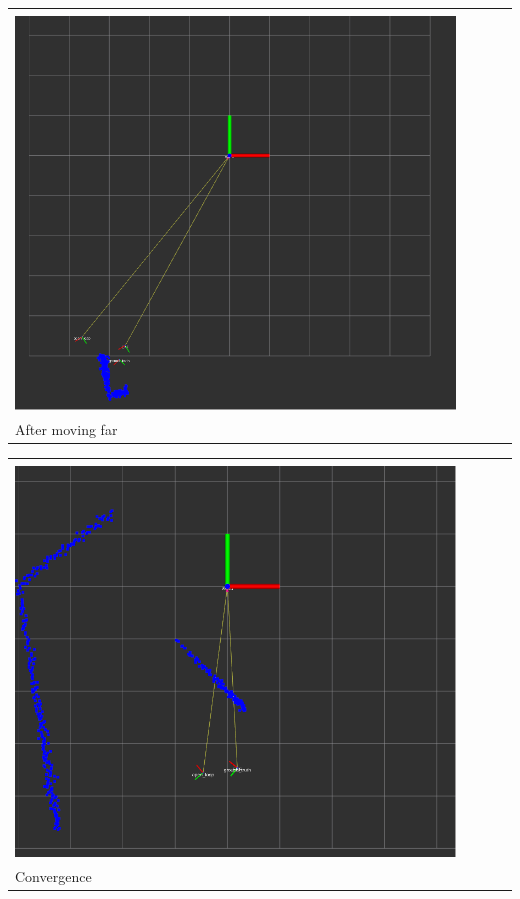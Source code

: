 \documentclass{article}
\begin{document}
\begin{enumerate}[label=(\roman*)]
\begin{tabular}[t]{l}
	\hline \\
	\includegraphics[width=0.9\textwidth]{img/p2-far.png} \\
	\hline
	After moving far \\
\end{tabular}

\begin{tabular}[t]{l}
	\hline \\
	\includegraphics[width=0.9\textwidth]{img/p2-converge.png} \\
	\hline
	Convergence \\
\end{tabular}

\end{enumerate}
\end{document}
